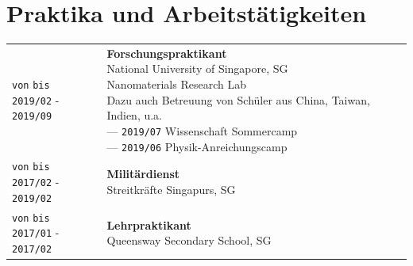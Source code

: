 \documentclass[11pt]{article}
\newcommand{\job}[1]{\textbf{#1}}
\newcommand{\country}[1]{\textcolor{Mahogany}{#1}}
\begin{document}
\section{\textcolor{section_2}{Praktika und Arbeitstätigkeiten}}
	\begin{center}
			\renewcommand{\arraystretch}{1.3}
			\renewcommand{\cellalign}{lt}
			\begin{tabularx}{0.9\textwidth}{  p{4cm}  X  }
				\makecell{\texttt{\footnotesize von} \hspace{2.4em} \texttt{\footnotesize bis} \\ \texttt{2019{\footnotesize /02}} - \texttt{2019{\footnotesize /09}}} & \makecell{\job{Forschungspraktikant} \\ 
					{\small National University of Singapore, SG} \\ 
					{\scriptsize Nanomaterials Research Lab} 
					\\ {\scriptsize Dazu auch Betreuung von Schüler aus \country{China}, \country{Taiwan}, \country{Indien}, u.a.}
					\\ --- \texttt{2019{\footnotesize /07}} {\scriptsize Wissenschaft Sommercamp}
					\\ --- \texttt{2019{\footnotesize /06}} {\scriptsize Physik-Anreichungscamp} 
				} \\
				\makecell{\texttt{\footnotesize von} \hspace{2.4em} \texttt{\footnotesize bis} \\ \texttt{2017{\footnotesize /02}} - \texttt{2019{\footnotesize /02}}} & \makecell{\job{Militärdienst}\\{\small Streitkräfte Singapurs, SG}} \\
				\makecell{\texttt{\footnotesize von} \hspace{2.4em} \texttt{\footnotesize bis} \\ \texttt{2017{\footnotesize /01}} - \texttt{2017{\footnotesize /02}}} & \makecell{\job{Lehrpraktikant}\\{\small Queensway Secondary School, SG}}
			\end{tabularx}
		\end{center}
\end{document}
